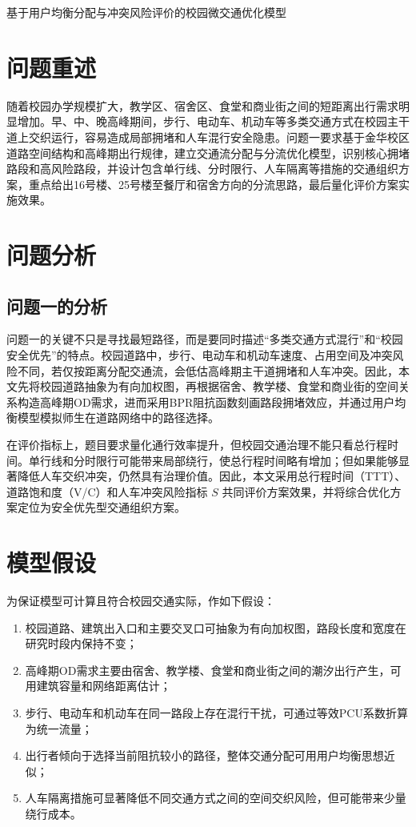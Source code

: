 \documentclass[UTF8,zihao=-4,a4paper]{ctexart}
\begin{document}
\begin{center}
{\heiti{} 基于用户均衡分配与冲突风险评价的校园微交通优化模型}
\end{center}

\section{问题重述}

随着校园办学规模扩大，教学区、宿舍区、食堂和商业街之间的短距离出行需求明显增加。早、中、晚高峰期间，步行、电动车、机动车等多类交通方式在校园主干道上交织运行，容易造成局部拥堵和人车混行安全隐患。问题一要求基于金华校区道路空间结构和高峰期出行规律，建立交通流分配与分流优化模型，识别核心拥堵路段和高风险路段，并设计包含单行线、分时限行、人车隔离等措施的交通组织方案，重点给出16号楼、25号楼至餐厅和宿舍方向的分流思路，最后量化评价方案实施效果。

\section{问题分析}

\subsection{问题一的分析}

问题一的关键不只是寻找最短路径，而是要同时描述“多类交通方式混行”和“校园安全优先”的特点。校园道路中，步行、电动车和机动车速度、占用空间及冲突风险不同，若仅按距离分配交通流，会低估高峰期主干道拥堵和人车冲突。因此，本文先将校园道路抽象为有向加权图，再根据宿舍、教学楼、食堂和商业街的空间关系构造高峰期OD需求，进而采用BPR阻抗函数刻画路段拥堵效应，并通过用户均衡模型模拟师生在道路网络中的路径选择。

在评价指标上，题目要求量化通行效率提升，但校园交通治理不能只看总行程时间。单行线和分时限行可能带来局部绕行，使总行程时间略有增加；但如果能够显著降低人车交织冲突，仍然具有治理价值。因此，本文采用总行程时间（TTT）、道路饱和度（V/C）和人车冲突风险指标 $S$ 共同评价方案效果，并将综合优化方案定位为安全优先型交通组织方案。

\section{模型假设}

为保证模型可计算且符合校园交通实际，作如下假设：
\begin{enumerate}
    \item 校园道路、建筑出入口和主要交叉口可抽象为有向加权图，路段长度和宽度在研究时段内保持不变；
    \item 高峰期OD需求主要由宿舍、教学楼、食堂和商业街之间的潮汐出行产生，可用建筑容量和网络距离估计；
    \item 步行、电动车和机动车在同一路段上存在混行干扰，可通过等效PCU系数折算为统一流量；
    \item 出行者倾向于选择当前阻抗较小的路径，整体交通分配可用用户均衡思想近似；
    \item 人车隔离措施可显著降低不同交通方式之间的空间交织风险，但可能带来少量绕行成本。
\end{enumerate}
\end{document}
